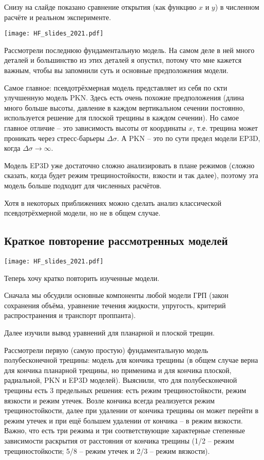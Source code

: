 \documentclass[main.tex]{subfiles}
\begin{document}
Снизу на слайде показано сравнение открытия (как функцию $x$ и $y$) в численном расчёте и реальном эксперименте.

\texttt{[image: HF\_slides\_2021.pdf]}

Рассмотрели последнюю фундаментальную модель.
На самом деле в ней много деталей и большинство из этих деталей я опустил, потому что мне кажется важным, чтобы вы запомнили суть и основные предположения модели.

Самое главное: псевдотрёхмерная модель представляет из себя по скти улучшенную модель PKN.
Здесь есть очень похожие предположения (длина много больше высоты, давление в каждом вертикальном сечении постоянно, используется решение для плоской трещины в каждом сечении).
Но самое главное отличие -- это зависимость высоты от координаты $x$, т.е. трещина может проникать через стресс-барьеры $\Delta\sigma$.
А PKN -- это по сути предел модели EP3D, когда $\Delta\sigma\to\infty$.

Модель EP3D уже достаточно сложно анализировать в плане режимов (сложно сказать, когда будет режим трещиностойкости, взкости и так далее), поэтому эта модель больше подходит для численных расчётов.

Хотя в некоторых приближениях можно сделать анализ классической псевдотрёхмерной модели, но не в общем случае.

\subsection{Краткое повторение рассмотренных моделей}

\texttt{[image: HF\_slides\_2021.pdf]}

Теперь хочу кратко повторить изученные модели.

Сначала мы обсудили основные компоненты любой модели ГРП (закон сохранения объёма, уравнение течения жидкости, упругость, критерий распространения и транспорт проппанта).

Далее изучили вывод уравнений для планарной и плоской трещин.

Рассмотрели первую (самую простую) фундаментальную модель полубесконечной трещины: модель для кончика трещины (в общем случае верна для кончика планарной трещины, но применима и для кончика плоской, радиальной, PKN и EP3D моделей).
Выяснили, что для полубесконечной трещины есть 3 предельных решения: есть режим трещиностойкости, режим вязкости и режим утечек.
Возле кончика всегда реализуется режим трещиностойкости, далее при удалении от кончика трещины он может перейти в режим утечек и при ещё большем удалении от кончика -- в режим вязкости.
Важно, что есть три режима и три соответствующие характерные степенные зависимости раскрытия от расстояния от кончика трещины (1/2 -- режим трещиностойкости; 5/8 -- режим утечек и 2/3 -- режим вязкости). 
\end{document}
